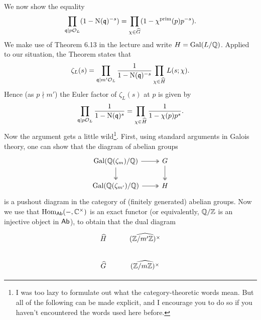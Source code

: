 \documentclass[a4paper,11pt]{article}
\begin{document}
\begin{enumerate}[wide, labelindent=0pt]
        We now show the equality
        \begin{equation*}
            \prod_{\mathfrak{q} \mid p\mathcal{O}_L} (1 - \operatorname{N}(\mathfrak{q})^{-s}) =
            \prod_{\chi \in \widehat G} (1 - \chi^{\mathrm{prim}}(p) p^{-s}).
        \end{equation*}
        We make use of Theorem 6.13 in the lecture and write 
        $H = \operatorname{Gal}(L/\mathbb{Q})$. Applied to our situation, the Theorem states that 
        \begin{equation*}
            \zeta_L(s) = \prod_{\mathfrak{q} \mid m' \mathcal{O}_L} \frac{1}{1-\operatorname{N}(\mathfrak{q})^{-s}}
                         \prod_{\chi \in \widehat {H}} L(s;\chi).
        \end{equation*}
        Hence (as $p \nmid m'$) the Euler factor of $\zeta_L(s)$ at $p$ is given by 
        \begin{equation*}
            \prod_{\mathfrak{q} \mid p\mathcal{O}_L}\frac{1}{1-\operatorname{N}(\mathfrak{q})^{s}} = \prod_{\chi \in
            \widehat H} \frac{1}{1-\chi(p)p^s}.
        \end{equation*}
        Now the argument gets a little wild\footnote{I was too lazy to formulate out what
            the category-theoretic words mean. But all of the following can be made
            explicit, and I encourage you to do so if you haven't encountered
            the words used here before.}. First, using standard arguments in Galois
        theory, one can show that the diagram of abelian groups 
        \begin{equation*}
            \begin{tikzcd}[ampersand replacement=\&]
            	{\Gal(\Q(\zeta_m)/\Q)} \& G \\
            	{\Gal(\Q(\zeta_{m'})/\Q)} \& {H }
            	\arrow[two heads, from=1-2, to=2-2]
            	\arrow[two heads, from=1-1, to=2-1]
            	\arrow[two heads, from=1-1, to=1-2]
            	\arrow[two heads, from=2-1, to=2-2]
            \end{tikzcd}
        \end{equation*}
        is a pushout diagram in the category of (finitely generated) abelian
        groups. Now we use that $\operatorname{Hom}_{\textnormal{$\textsf{Ab}$}}(-, \mathbb{C}^\times)$ is an exact functor
        (or equivalently, $\mathbb{Q}/\mathbb{Z}$ is an injective object in $\textnormal{$\textsf{Ab}$}$), to obtain 
        that the dual diagram
        \begin{equation*}
            \begin{tikzcd}[ampersand replacement=\&]
            	{\hat H} \& {\hat {(\Z/m'\Z)^\times}} \\
            	{\hat G} \& {\hat {(\Z/m\Z)^\times}}

\end{tikzcd}
\end{equation*}
\end{enumerate}
\end{document}
